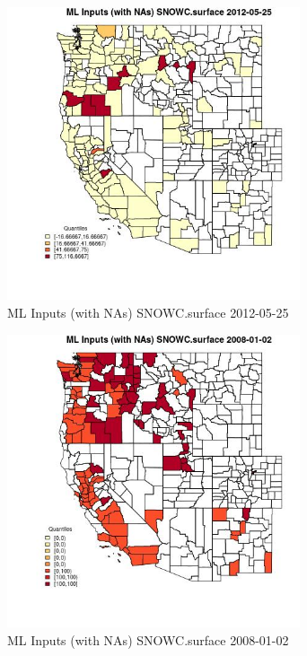 \clearpage 

\begin{figure} 
\centering  
\includegraphics[width=0.77\textwidth]{Code_Outputs/Report_ML_input_PM25_Step4_part_e_de_duplicated_aves_compiled_2019-05-18wNAs_CountySNOWCsurfaceMean2012-05-25_2012-05-25.jpg} 
\caption{\label{fig:Report_ML_input_PM25_Step4_part_e_de_duplicated_aves_compiled_2019-05-18wNAsCountySNOWCsurfaceMean2012-05-25_2012-05-25}ML Inputs (with NAs) SNOWC.surface 2012-05-25} 
\end{figure} 
 

\begin{figure} 
\centering  
\includegraphics[width=0.77\textwidth]{Code_Outputs/Report_ML_input_PM25_Step4_part_e_de_duplicated_aves_compiled_2019-05-18wNAs_CountySNOWCsurfaceMean2008-01-02_2008-01-02.jpg} 
\caption{\label{fig:Report_ML_input_PM25_Step4_part_e_de_duplicated_aves_compiled_2019-05-18wNAsCountySNOWCsurfaceMean2008-01-02_2008-01-02}ML Inputs (with NAs) SNOWC.surface 2008-01-02} 
\end{figure} 
 

